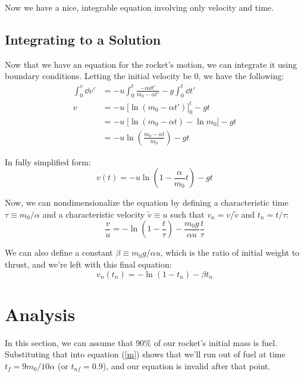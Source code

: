 \documentclass{article}
\begin{document}
Now we have a nice, integrable equation involving only velocity and time.

\subsection{Integrating to a Solution}

Now that we have an equation for the rocket's motion, we can integrate it using boundary conditions. Letting the initial velocity be 0, we have the following:
\begin{equation*}
\begin{aligned}
\int_0^v\dd{v'}&= -u\int_0^t\frac{-\alpha \dd{t'}}{m_0-\alpha t'} -g\int_0^t\dd{t'} \\
v &= -u\;\Bigg[\ln (m_0 - \alpha t')\Bigg]_0^t - gt \\
&= -u\;\Bigg[\ln (m_0 - \alpha t) - \ln m_0\Bigg] - gt \\
&= -u\ln \left(\frac{m_0 - \alpha t}{m_0}\right) - gt
\end{aligned}
\end{equation*}

In fully simplified form:
\begin{equation}\label{dimensional}
v(t) = -u\ln\left(1 - \frac{\alpha}{m_0}t\right)-gt
\end{equation}

Now, we can nondimensionalize the equation by defining a characteristic time $\tau \equiv m_0/\alpha$ and a characteristic velocity $\tilde{v} \equiv u$ such that $v_n = v/\tilde{v}$ and $t_n = t/\tau$:
\begin{equation*}
\frac{v}{u} = -\ln\left(1 - \frac{t}{\tau}\right)- \frac{m_0g}{\alpha u}\frac{t}{\tau}
\end{equation*}

We can also define a constant $\beta \equiv m_0 g/\alpha u$, which is the ratio of initial weight to thrust, and we're left with this final equation:
\begin{equation}\label{nondimensional}
v_n(t_n) = -\ln (1-t_n) - \beta t_n
\end{equation}

\section{Analysis}

In this section, we can assume that 90\% of our rocket's initial mass is fuel. Substituting that into equation (\ref{m}) shows that we'll run out of fuel at time $t_f = 9m_0/10\alpha$ (or $t_{nf} = 0.9$), and our equation is invalid after that point.
\end{document}
